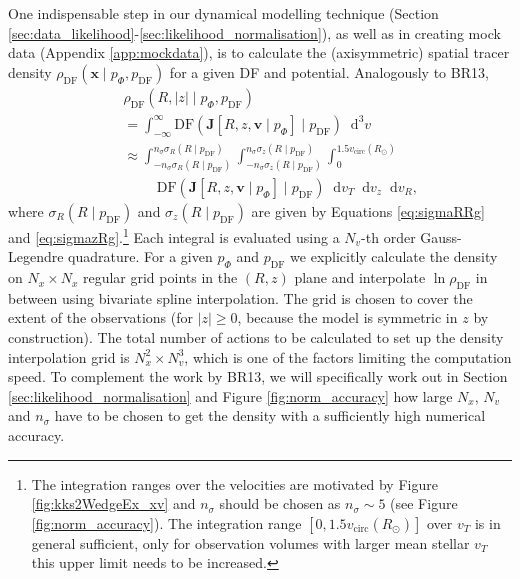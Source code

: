 \documentclass[iop,revtex4,numberedappendix,appendixfloats]{emulateapj}
\newcommand{\vect}[1]{\boldsymbol{#1}}
\newcommand*\diff{\mathop{}\!\mathrm{d}}
\newcommand*\Diff[1]{\mathop{}\!\mathrm{d^#1}}
\begin{document}
One indispensable step in our dynamical modelling technique (Section \ref{sec:data_likelihood}-\ref{sec:likelihood_normalisation}), as well as in creating mock data (Appendix \ref{app:mockdata}), is to calculate the (axisymmetric) spatial tracer density $\rho_\text{DF}(\vect{x} \mid p_{\Phi},p_\text{DF})$ for a given DF and potential. Analogously to BR13, 
\begin{eqnarray}
&&\rho_\text{DF}(R,|z| \mid p_{\Phi},p_\text{DF}) \nonumber\\
&&= \int_{-\infty}^{\infty} \text{DF}(\vect{J}[R,z,\vect{v} \mid p_{\Phi}] \mid p_\text{DF}) \Diff3 v \nonumber\\
&&\approx \int_{-n_\sigma \sigma_R(R \mid p_\text{DF})}^{n_\sigma \sigma_R(R \mid p_\text{DF})} \int_{-n_\sigma\sigma_z(R \mid p_\text{DF})}^{n_\sigma \sigma_z(R \mid p_\text{DF})} \int_{0}^{1.5 v_\text{circ}(R_\odot)} \nonumber\\
& & \hspace{1cm} \text{DF}(\vect{J}[R,z,\vect{v} \mid p_{\Phi}] \mid p_\text{DF}) \diff v_T \diff v_z \diff v_R, \label{eq:tracerdensity}
\end{eqnarray}
where $\sigma_R(R \mid p_\text{DF})$ and $\sigma_z(R \mid p_\text{DF})$ are given by Equations \eqref{eq:sigmaRRg} and \eqref{eq:sigmazRg}.\footnote{The integration ranges over the velocities are motivated by Figure \ref{fig:kks2WedgeEx_xv} and $n_\sigma$ should be chosen as $n_\sigma \sim 5$ (see Figure \ref{fig:norm_accuracy}). The integration range $[0,1.5 v_\text{circ}(R_\odot)]$ over $v_T$ is in general sufficient, only for observation volumes with larger mean stellar $v_T$ this upper limit needs to be increased.} Each integral is evaluated using a $N_v$-th order Gauss-Legendre quadrature. For a given $p_\Phi$ and $p_\text{DF}$ we explicitly calculate the density on $N_x \times N_x$ regular grid points in the $(R,z)$ plane and interpolate $\ln \rho_\text{DF}$ in between using bivariate spline interpolation. The grid is chosen to cover the extent of the observations (for $|z|\geq0$, because the model is symmetric in $z$ by construction). The total number of actions to be calculated to set up the density interpolation grid is $N_x^2 \times N_v^3$, which is one of the factors limiting the computation speed. To complement the work by BR13, we will specifically work out in Section \ref{sec:likelihood_normalisation} and Figure \ref{fig:norm_accuracy} how large $N_x$, $N_v$ and $n_\sigma$ have to be chosen to get the density with a sufficiently high numerical accuracy. 
\end{document}
